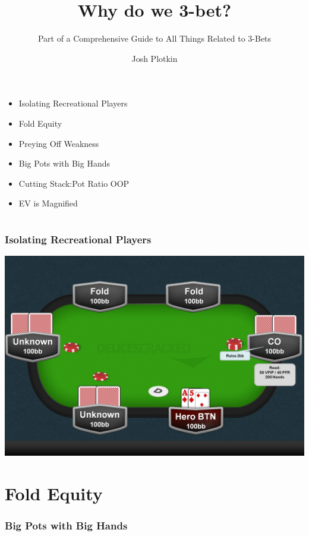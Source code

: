 \documentclass{beamer}
\title{Why do we 3-bet?}
\subtitle{Part of a Comprehensive Guide to All Things Related to 3-Bets}
\author{Josh Plotkin}
\institute{DeucesCracked.com}
\date{}
\begin{document}
\frame{\titlepage}


\section[Outline]{}
\begin{frame}
\begin{itemize}
\frametitle{Outline}
\item Isolating Recreational Players
\pause
\item Fold Equity
\pause
\item Preying Off Weakness
\pause
\item Big Pots with Big Hands
\pause
\item Cutting Stack:Pot Ratio OOP
\pause
\item EV is Magnified
\end{itemize}
\end{frame}

\section[Isolating Weak Players]{}
\begin{frame}
\frametitle{Isolating Recreational Players}
\includegraphics[keepaspectratio=true,width=.75\paperwidth]{Isolate.png}
\end{frame}


\section{Fold Equity}
\begin{frame}
\frametitle{Big Pots with Big Hands}
\end{frame}
\end{document}
